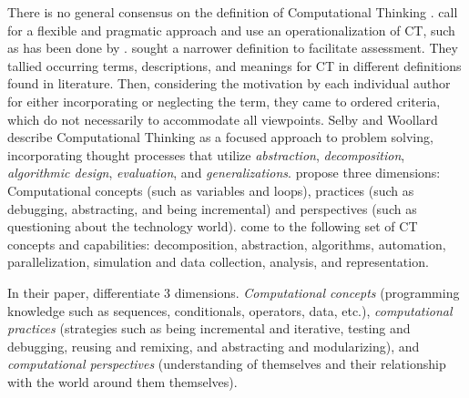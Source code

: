 There is no general consensus on the definition of Computational Thinking \cite{Yadav2015}.  call for a flexible and pragmatic approach and use an operationalization of CT, such as has been done by .  sought a narrower definition to facilitate assessment. They tallied occurring terms, descriptions, and meanings for CT in different definitions found in literature. Then, considering the motivation by each individual author for either incorporating or neglecting the term, they came to ordered criteria, which do not necessarily to accommodate all viewpoints. Selby and Woollard \cite{selby2013computational} describe Computational Thinking as a focused approach to problem solving, incorporating thought processes that utilize \emph{abstraction}, \emph{decomposition}, \emph{algorithmic design}, \emph{evaluation}, and \emph{generalizations}.  propose three dimensions: Computational concepts (such as variables and loops), practices (such as debugging, abstracting, and being incremental) and perspectives (such as  questioning about the technology world).  come to the following set of CT concepts and capabilities: decomposition, abstraction, algorithms, automation, parallelization, simulation and data collection, analysis, and representation.
%

In their paper,   differentiate 3 dimensions. \emph{Computational concepts} (programming knowledge such as sequences, conditionals, operators, data, etc.), \emph{computational practices} (strategies such as being incremental and
iterative, testing and debugging, reusing and remixing, and abstracting and modularizing), and \emph{computational perspectives} (understanding of themselves and their relationship with the world around them themselves).



